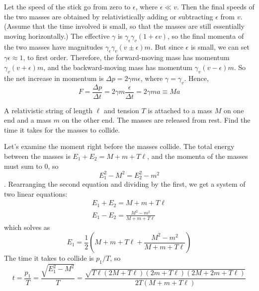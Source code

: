 \documentclass[11pt]{scrartcl}
\begin{document}
\begin{sol}
    Let the speed of the stick go from zero to $\epsilon$, where $\epsilon \ll v$. Then the final speeds of the two masses are obtained by relativistically adding or subtracting $\epsilon$ from $v$. (Assume that the time involved is small, so that the masses are still essentially moving horizontally.) The effective $\gamma$ is $\gamma_\epsilon\gamma_v(1+\epsilon v)$, so the final momenta of the two masses have magnitudes $\gamma_\epsilon \gamma_v(v\pm \epsilon)m$. But since $\epsilon$ is small, we can set $\gamma \epsilon \approx 1$, to first order. Therefore, the forward-moving mass has momentum $\gamma_v(v + \epsilon)m$, and the backward-moving mass has momentum $\gamma_v(v-\epsilon)m$. So the net increase in momentum is $\Delta p=2\gamma m\epsilon$, where $\gamma=\gamma_v$. Hence, $$F=\frac{\Delta p}{\Delta t}=2\gamma m\frac{\epsilon}{\Delta t}=2\gamma ma\equiv Ma$$
\end{sol}

\begin{prob}
    A relativistic string of length $\ell$ and tension $T$ is attached to a mass $M$ on one end and a mass $m$ on the other end. The masses are released from rest. Find the time it takes for the masses to collide. 
\end{prob}

\begin{sol}
    Let's examine the moment right before the masses collide. The total energy between the masses is $E_1+E_2=M+m+T\ell$, and the momenta of the masses must sum to 0, so $$E_1^2-M^2=E_2^2-m^2$$. Rearranging the second equation and dividing by the first, we get a system of two linear equations: \begin{gather*}
        E_1+E_2=M+m+T\ell\\
        E_1-E_2=\frac{M^2-m^2}{M+m+T\ell}
    \end{gather*}which solves as $$E_1=\frac12\left(M+m+T\ell+\frac{M^2-m^2}{M+m+T\ell}\right)$$ The time it takes to collide is $p_1/T$, so $$t=\frac{p_1}{T}=\frac{\sqrt{E_1^2-M^2}}{T}=\boxed{\frac{\sqrt{T\ell(2M+T\ell)(2m+T\ell)(2M+2m+T\ell)}}{2T(M+m+T\ell)}}$$
\end{sol}
\end{document}
